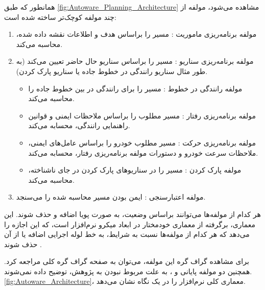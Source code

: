 همانطور که طبق \cref{fig:Autoware_Planning_Architecture} مشاهده می‌شود، مولفه  از چند مولفه کوچک‌تر ساخته شده است:
\begin{enumerate}
    \item مولفه برنامه‌ریزی ماموریت :‌ مسیر را براساس هدف و اطلاعات نقشه  داده شده، محاسبه می‌کند.
    \item مولفه برنامه‌ریزی سناریو : مسیر را براساس سناریو حال حاضر تعیین می‌کند (به طور مثال سناریو رانندگی در خطوط جاده یا سناریو پارک کردن).
    \begin{itemize}
        \item مولفه رانندگی در خطوط : مسیر را برای رانندگی در بین خطوط جاده را محاسبه می‌کند.
        \item مولفه برنامه‌ریزی رفتار : مسیر مطلوب را براساس ملاحظات ایمنی و قوانین راهنمایی رانندگی، محسابه می‌کند.
        \item مولفه برنامه‌ریزی حرکت : مسیر مطلوب خودرو را براساس عامل‌های ایمنی، ملاحظات سرعت خودرو و دستورات مولفه برنامه‌ریزی رفتار، محسابه می‌کند.
        \item مولفه پارک کردن : مسیر را در سناریوهای پارک کردن در جای ناشناخته، محاسبه می‌کند.
    \end{itemize}
    \item مولفه اعتبارسنجی : ایمن بودن مسیر محاسبه شده را می‌سنجد.
\end{enumerate}

هر کدام از مولفه‌ها می‌توانند براساس وضعیت، به صورت پویا اضافه و حذف شوند. این معماری، برگرفته از معماری خودمختار در ابعاد میکرو نرم‌افزار  است، که این اجازه را می‌دهد که هر کدام از مولفه‌ها نسبت به شرایط، به خط‌ لوله اجرایی اضافه یا از آن حذف شوند \cite{Autoware:Documentation}. 

برای مشاهده گراف گره این مولفه، می‌توان به صفحه گراف گره کلی  مراجعه کرد. همچنین دو مولفه پایانی  و ، به علت مربوط نبودن به پژوهش، توضیح داده نمی‌شوند. \cref{fig:Autoware_Architecture}،‌ معماری کلی نرم‌افزار  را در یک نگاه نشان می‌دهد.


